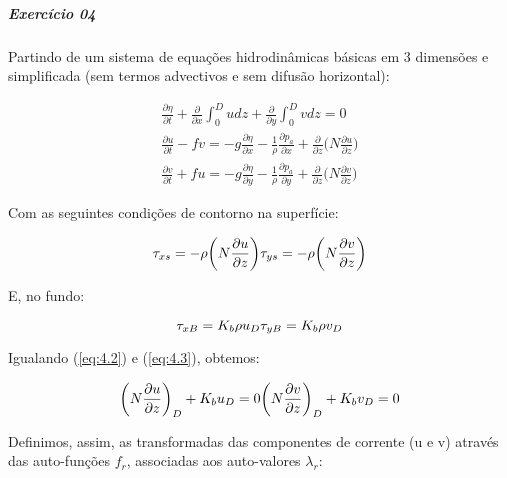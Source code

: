\documentclass[11pt]{article}
\begin{document}
    \subparagraph{Exercício 04}\label{exercuxedcio-04}

Partindo de um sistema de equações hidrodinâmicas básicas em 3 dimensões
e simplificada (sem termos advectivos e sem difusão horizontal):

\begin{equation}
  \begin{aligned}
  \frac{\partial{\eta}}{\partial{t}} + \frac{\partial}{\partial{x}}\int_{0}^{D}udz + \frac{\partial}{\partial{y}}\int_{0}^{D}vdz = 0
  \\
  \frac{\partial{u}}{\partial{t}} - fv = -g\frac{\partial{\eta}}{\partial{x}} - \frac{1}{\rho}\frac{\partial{p_a}}{\partial{x}} + \frac{\partial}{\partial{z}}\bigg( N\frac{\partial{u}}{\partial{z}} \bigg)
  \\
  \frac{\partial{v}}{\partial{t}} + fu = -g\frac{\partial{\eta}}{\partial{y}} - \frac{1}{\rho}\frac{\partial{p_a}}{\partial{y}} + \frac{\partial}{\partial{z}}\bigg( N\frac{\partial{v}}{\partial{z}} \bigg)
  \label{eq:4.1}
  \end{aligned}
\end{equation}

Com as seguintes condições de contorno na superfície:

\begin{equation}
    \tau_{xs} = -\rho\bigg( N\frac{\partial{u}}{\partial{z}} \bigg)
    \\
    \tau_{ys} = -\rho\bigg( N\frac{\partial{v}}{\partial{z}} \bigg)
    \label{eq:4.2}
\end{equation}

E, no fundo:

\begin{equation}
    \tau_{xB} = K_b\rho u_D
    \\
    \tau_{yB} = K_b\rho v_ D
    \label{eq:4.3}
\end{equation}

Igualando (\ref{eq:4.2}) e (\ref{eq:4.3}), obtemos:

\begin{equation}
    \bigg( N\frac{\partial{u}}{\partial{z}} \bigg)_D + K_b u_D = 0
    \\
    \bigg( N\frac{\partial{v}}{\partial{z}} \bigg)_D + K_b v_ D = 0
    \label{eq:4.4}
\end{equation}

Definimos, assim, as transformadas das componentes de corrente (u e v)
através das auto-funções \(f_r\), associadas aos auto-valores
\(\lambda_r\):
\end{document}
